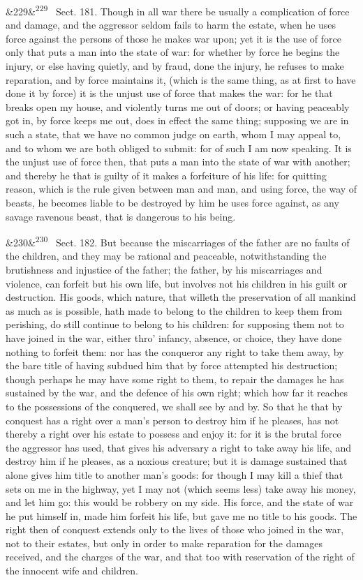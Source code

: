 \documentclass[12pt]{article}
\newcommand{\para}[1][]{\par\noindent\ifx&#1&\else\textsuperscript{\footnotesize #1}~\fi}
\begin{document}
\para[229] Sect. 181. Though in all war there be usually a complication of force and damage, and the aggressor seldom fails to harm the estate, when he uses force against the persons of those he makes war upon; yet it is the use of force only that puts a man into the state of war: for whether by force he begins the injury, or else having quietly, and by fraud, done the injury, he refuses to make reparation, and by force maintains it, (which is the same thing, as at first to have done it by force) it is the unjust use of force that makes the war: for he that breaks open my house, and violently turns me out of doors; or having peaceably got in, by force keeps me out, does in effect the same thing; supposing we are in such a state, that we have no common judge on earth, whom I may appeal to, and to whom we are both obliged to submit: for of such I am now speaking. It is the unjust use of force then, that puts a man into the state of war with another; and thereby he that is guilty of it makes a forfeiture of his life: for quitting reason, which is the rule given between man and man, and using force, the way of beasts, he becomes liable to be destroyed by him he uses force against, as any savage ravenous beast, that is dangerous to his being.

\para[230] Sect. 182. But because the miscarriages of the father are no faults of the children, and they may be rational and peaceable, notwithstanding the brutishness and injustice of the father; the father, by his miscarriages and violence, can forfeit but his own life, but involves not his children in his guilt or destruction. His goods, which nature, that willeth the preservation of all mankind as much as is possible, hath made to belong to the children to keep them from perishing, do still continue to belong to his children: for supposing them not to have joined in the war, either thro' infancy, absence, or choice, they have done nothing to forfeit them: nor has the conqueror any right to take them away, by the bare title of having subdued him that by force attempted his destruction; though perhaps he may have some right to them, to repair the damages he has sustained by the war, and the defence of his own right; which how far it reaches to the possessions of the conquered, we shall see by and by. So that he that by conquest has a right over a man's person to destroy him if he pleases, has not thereby a right over his estate to possess and enjoy it: for it is the brutal force the aggressor has used, that gives his adversary a right to take away his life, and destroy him if he pleases, as a noxious creature; but it is damage sustained that alone gives him title to another man's goods: for though I may kill a thief that sets on me in the highway, yet I may not (which seems less) take away his money, and let him go: this would be robbery on my side. His force, and the state of war he put himself in, made him forfeit his life, but gave me no title to his goods. The right then of conquest extends only to the lives of those who joined in the war, not to their estates, but only in order to make reparation for the damages received, and the charges of the war, and that too with reservation of the right of the innocent wife and children.
\end{document}
